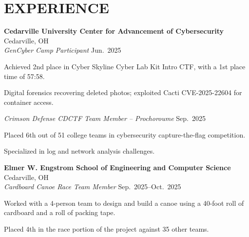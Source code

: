 \documentclass[a4paper,10pt]{article}
\makeatletter
\newlength{\mpwidth}
\newenvironment{orgblock}[2]{%
  \par\noindent
  \textbf{#1} \hfill #2\\%
}{%
  \par\vspace{6pt}%
}
\newenvironment{subxp}[2]{%
  \noindent\textit{#1} \hfill #2\\%
  \begin{minipage}[t]{\mpwidth}%
    \begingroup
      \setlength{\leftskip}{0pt}%
      \setlength{\parindent}{0pt}%
      \setlength{\parskip}{0pt}%
      \makeatletter
      \def\my@itemize{%
        \list{\labelitemi}{%
          \setlength{\leftmargin}{0.8em}%
          \setlength{\itemindent}{0pt}%
          \setlength{\labelsep}{0.6em}%
          \setlength{\labelwidth}{0pt}%
          \setlength{\parsep}{0pt}%
          \setlength{\topsep}{0pt}%
          \setlength{\partopsep}{0pt}%
          \setlength{\itemsep}{3pt}%
        }%
      }%
      \makeatother
      \renewcommand{\labelitemi}{\textendash}%
      \my@itemize
}{%
      \endlist
    \endgroup
  \end{minipage}%
  \par\vspace{2pt}%
}
\makeatother
\begin{document}
\section{EXPERIENCE}

\begin{orgblock}{Cedarville University Center for Advancement of Cybersecurity}{Cedarville, OH}
  \begin{subxp}{GenCyber Camp Participant}{Jun.\ 2025}
    \item Achieved 2nd place in Cyber Skyline Cyber Lab Kit Intro CTF, with a 1st place time of 57:58.
    \item Digital forensics recovering deleted photos; exploited Cacti CVE-2025-22604 for container access.
  \end{subxp}

  \begin{subxp}{Crimson Defense CDCTF Team Member -- Prochoroume}{Sep.\ 2025}
    \item Placed 6th out of 51 college teams in cybersecurity capture-the-flag competition.
    \item Specialized in log and network analysis challenges.
  \end{subxp}
\end{orgblock}

\begin{orgblock}{Elmer W. Engstrom School of Engineering and Computer Science}{Cedarville, OH}
  \begin{subxp}{Cardboard Canoe Race Team Member}{Sep.\ 2025--Oct.\ 2025}
    \item Worked with a 4-person team to design and build a canoe using a 40-foot roll of cardboard and a roll of packing tape.
    \item Placed 4th in the race portion of the project against 35 other teams.
  \end{subxp}
\end{orgblock}
\end{document}
